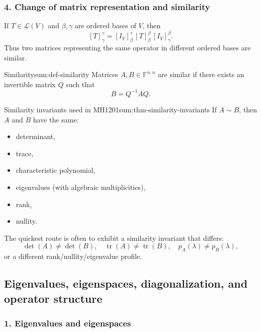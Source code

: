 \subsubsection*{4. Change of matrix representation and similarity}

If \(T\in\mathcal{L}(V)\) and \(\beta,\gamma\) are ordered bases of \(V\), then
\[
[T]^\gamma_\gamma
=
[I_V]^\gamma_\beta\,[T]^\beta_\beta\,[I_V]^\beta_\gamma.
\]
Thus two matrices representing the same operator in different ordered bases are similar.

\begin{definition}{Similarity}{sum:def-similarity}
Matrices \(A,B\in \mathbb{F}^{n,n}\) are similar if there exists an invertible matrix \(Q\) such that
\[
B=Q^{-1}AQ.
\]
\end{definition}

\begin{theorem}{Similarity invariants used in MH1201}{sum:thm-similarity-invariants}
If \(A\sim B\), then \(A\) and \(B\) have the same:
\begin{itemize}[leftmargin=*]
    \item determinant,
    \item trace,
    \item characteristic polynomial,
    \item eigenvalues (with algebraic multiplicities),
    \item rank,
    \item nullity.
\end{itemize}
\end{theorem}

\begin{examtip}[title={Exam Focus: how to show two matrices are not similar}]
The quickest route is often to exhibit a similarity invariant that differs:
\[
\det(A)\neq \det(B),\quad
\operatorname{tr}(A)\neq \operatorname{tr}(B),\quad
p_A(\lambda)\neq p_B(\lambda),
\]
or a different rank/nullity/eigenvalue profile.
\end{examtip}

\subsection{Eigenvalues, eigenspaces, diagonalization, and operator structure}

\subsubsection*{1. Eigenvalues and eigenspaces}

